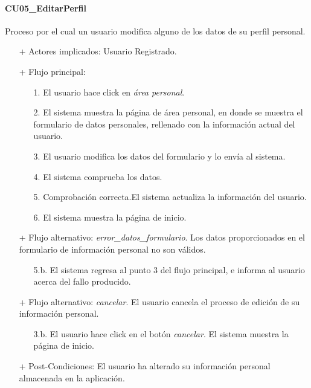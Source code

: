 \documentclass[a4paper,12pt,twoside,openright]{report}
\begin{document}
            \paragraph{CU05\_EditarPerfil}
                Proceso por el cual un usuario modifica alguno de los datos de su perfil personal.
                \begin{itemize}
                    \item[+] Actores implicados: Usuario Registrado.
                    \item[+] Flujo principal:
                    \begin{enumerate}
                        \item[1.] El usuario hace click en \emph{área personal}.
                        \item[2.] El sistema muestra la página de área personal, en donde se muestra el formulario de datos personales, rellenado con la información actual del usuario.
                        \item[3.] El usuario modifica los datos del formulario y lo envía al sistema.
                        \item[4.] El sistema comprueba los datos.
                        \item[5.] Comprobación correcta.El sistema actualiza la información del usuario.
                        \item[6.] El sistema muestra la página de inicio.
                    \end{enumerate}
                    \item[+] Flujo alternativo: \emph{error\_datos\_formulario}. Los datos proporcionados en el formulario de información personal no son válidos.
                    \begin{itemize}
                        \item[5.b.] El sistema regresa al punto 3 del flujo principal, e informa al usuario acerca del fallo producido.
                    \end{itemize}
                    \item[+] Flujo alternativo: \emph{cancelar}. El usuario cancela el proceso de edición de su información personal.
                    \begin{itemize}
                        \item[3.b.] El usuario hace click en el botón \emph{cancelar}. El sistema muestra la página de inicio.
                    \end{itemize}
                    \item[+] Post-Condiciones: El usuario ha alterado su información personal almacenada en la aplicación.
                \end{itemize}
\end{document}
